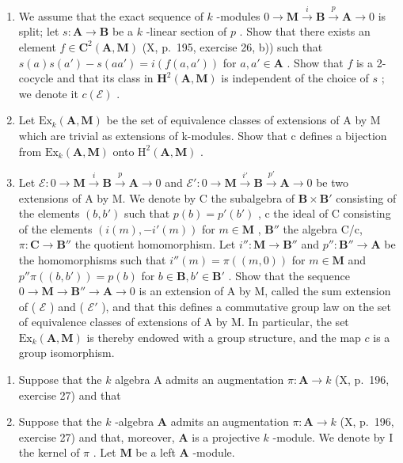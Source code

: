 \begin{enumerate}
\def\labelenumi{\alph{enumi})}
\item
  We assume that the exact sequence of \(k\) -modules \(0 \to \mathbf{M} \xrightarrow{i} \mathbf{B} \xrightarrow{p} \mathbf{A} \to 0\) is split; let \(s: \mathbf{A} \to \mathbf{B}\) be a \(k\) -linear section of \(p\) . Show that there exists an element \(f \in \mathbf{C}^2(\mathbf{A}, \mathbf{M})\) (X, p.~195, exercise 26, b)) such that \(s(a) s(a') - s(aa') = i(f(a, a'))\) for \(a, a' \in \mathbf{A}\) . Show that \(f\) is a 2-cocycle and that its class in \(\mathbf{H}^2(\mathbf{A}, \mathbf{M})\) is independent of the choice of \(s\) ; we denote it \(c(\mathcal{E})\) .
\item
  Let \(\mathrm{Ex}_{k}(\mathbf{A},\mathbf{M})\) be the set of equivalence classes of extensions of A by M which are trivial as extensions of k-modules. Show that c defines a bijection from \(\mathrm{Ex}_{k}(\mathbf{A},\mathbf{M})\) onto \(\mathrm{H}^{2}(\mathbf{A},\mathbf{M})\) .
\item
  Let \(\mathcal{E}:0\to\mathbf{M}\stackrel{i}{\to}\mathbf{B}\stackrel{p}{\to}\mathbf{A}\to0\) and \(\mathcal{E}':0\to\mathbf{M}\stackrel{i'}{\to}\mathbf{B}\stackrel{p'}{\to}\mathbf{A}\to0\) be two extensions of A by M. We denote by C the subalgebra of \(\mathbf{B}\times\mathbf{B}'\) consisting of the elements \((b,b')\) such that \(p(b)=p'(b')\) , c the ideal of C consisting of the elements \((i(m),-i'(m))\) for \(m\in\mathbf{M}\) , \(\mathbf{B}''\) the algebra C/c, \(\pi:\mathbf{C}\to\mathbf{B}''\) the quotient homomorphism. Let \(i'':\mathbf{M}\to\mathbf{B}''\) and \(p'':\mathbf{B}''\to\mathbf{A}\) be the homomorphisms such that \(i''(m)=\pi((m,0))\) for \(m\in\mathbf{M}\) and \(p''\pi((b,b'))=p(b)\) for \(b\in\mathbf{B},b'\in\mathbf{B}'\) . Show that the sequence \(0\to\mathbf{M}\to\mathbf{B}''\to\mathbf{A}\to0\) is an extension of A by M, called the sum extension of ( \(\mathcal{E}\) ) and ( \(\mathcal{E}'\) ), and that this defines a commutative group law on the set of equivalence classes of extensions of A by M. In particular, the set \(\mathrm{Ex}_{k}(\mathbf{A},\mathbf{M})\) is thereby endowed with a group structure, and the map \(c\) is a group isomorphism.
\end{enumerate}

\begin{enumerate}
\def\labelenumi{\arabic{enumi})}
\setcounter{enumi}{1}
\item
  Suppose that the \(k\) algebra A admits an augmentation \(\pi:\mathbf{A}\to k\) (X, p.~196, exercise 27) and that
\item
  Suppose that the \(k\) -algebra \(\mathbf{A}\) admits an augmentation \(\pi : \mathbf{A} \to k\) (X, p.~196, exercise 27) and that, moreover, \(\mathbf{A}\) is a projective \(k\) -module. We denote by I the kernel of \(\pi\) . Let \(\mathbf{M}\) be a left \(\mathbf{A}\) -module.
\end{enumerate}

